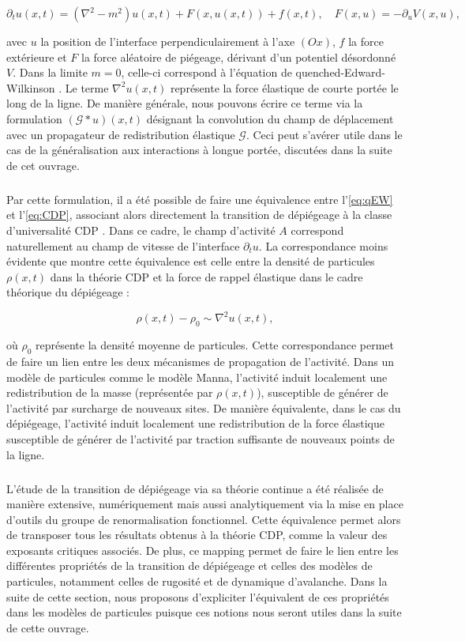 \begin{equation}
	\partial_t u (x,t) = (\nabla^2 - m^2)u(x,t) + F(x, u(x,t)) + f(x,t), \quad F(x,u) = - \partial_u V(x,u),
	\label{eq:qEW}
\end{equation}

\noindent avec $u$ la position de l'interface perpendiculairement à l'axe $(Ox)$, $f$ la force extérieure et $F$ la force aléatoire de piégeage, dérivant d'un potentiel désordonné $V$. Dans la limite $m=0$, celle-ci correspond à l'équation de quenched-Edward-Wilkinson \cite{nattermann_dynamics_1992}. Le terme $\nabla^2 u (x,t)$ représente la force élastique de courte portée le long de la ligne. De manière générale, nous pouvons écrire ce terme via la formulation $(\mathcal{G}\ast u) (x,t)$ désignant la convolution du champ de déplacement avec un propagateur de redistribution élastique $\mathcal{G}$. Ceci peut s'avérer utile dans le cas de la généralisation aux interactions à longue portée, discutées dans la suite de cet ouvrage.

\subparagraph{}Par cette formulation, il a été possible de faire une équivalence entre l'\autoref{eq:qEW} et l'\autoref{eq:CDP}, associant alors directement la transition de dépiégeage à la classe d'universalité CDP \cite{le_doussal_exact_2015, wiese_hyperuniformity_2024}. Dans ce cadre, le champ d'activité $A$ correspond naturellement au champ de vitesse de l'interface $\partial_t u$. La correspondance moins évidente que montre cette équivalence est celle entre la densité de particules $\rho(x,t)$ dans la théorie CDP et la force de rappel élastique dans le cadre théorique du dépiégeage :

\begin{equation}
	\rho(x,t) - \rho_0 \sim \nabla^2 u (x,t),
	\label{eq:equivCDPdépiégeage}
\end{equation}

\noindent où $\rho_0$ représente la densité moyenne de particules. Cette correspondance permet de faire un lien entre les deux mécanismes de propagation de l'activité. Dans un modèle de particules comme le modèle Manna, l'activité induit localement une redistribution de la masse (représentée par $\rho(x,t)$), susceptible de générer de l'activité par surcharge de nouveaux sites. De manière équivalente, dans le cas du dépiégeage, l'activité induit localement une redistribution de la force élastique susceptible de générer de l'activité par traction suffisante de nouveaux points de la ligne.

\subparagraph{}L'étude de la transition de dépiégeage via sa théorie continue a été réalisée de manière extensive, numériquement mais aussi analytiquement via la mise en place d'outils du groupe de renormalisation fonctionnel. Cette équivalence permet alors de transposer tous les résultats obtenus à la théorie CDP, comme la valeur des exposants critiques associés. De plus, ce mapping permet de faire le lien entre les différentes propriétés de la transition de dépiégeage et celles des modèles de particules, notamment celles de rugosité et de dynamique d'avalanche. Dans la suite de cette section, nous proposons d'expliciter l'équivalent de ces propriétés dans les modèles de particules puisque ces notions nous seront utiles dans la suite de cette ouvrage.

